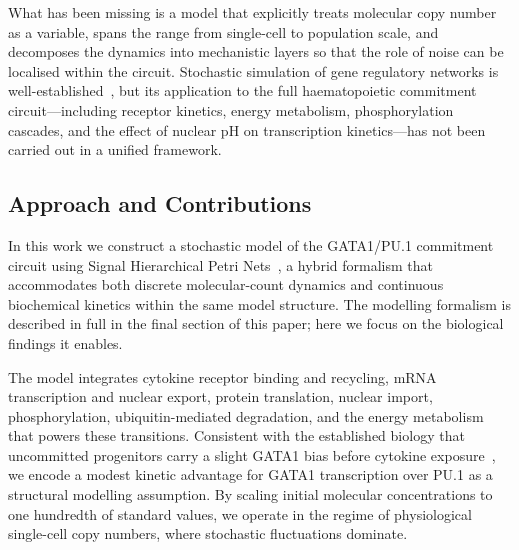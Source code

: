 What has been missing is a model that explicitly treats molecular copy number as
a variable, spans the range from single-cell to population scale, and
decomposes the dynamics into mechanistic layers so that the role of noise can be
localised within the circuit. Stochastic simulation of gene regulatory networks
is well-established~\cite{gillespie1977}, but its application to the full
haematopoietic commitment circuit---including receptor kinetics, energy
metabolism, phosphorylation cascades, and the effect of nuclear pH on
transcription kinetics---has not been carried out in a unified framework.

\subsection{Approach and Contributions}

In this work we construct a stochastic model of the GATA1/PU.1 commitment
circuit using Signal Hierarchical Petri Nets~\cite{shypn2026}, a hybrid
formalism that accommodates both discrete molecular-count dynamics and continuous
biochemical kinetics within the same model structure. The modelling formalism is
described in full in the final section of this paper; here we focus on the
biological findings it enables.

The model integrates cytokine receptor binding and recycling, mRNA transcription
and nuclear export, protein translation, nuclear import, phosphorylation,
ubiquitin-mediated degradation, and the energy metabolism that powers these
transitions. Consistent with the established biology that uncommitted progenitors
carry a slight GATA1 bias before cytokine exposure~\cite{cantor2002}, we encode a
modest kinetic advantage for GATA1 transcription over PU.1 as a structural
modelling assumption. By scaling initial molecular concentrations to one hundredth
of standard values, we operate in the regime of physiological single-cell copy
numbers, where stochastic fluctuations dominate.

